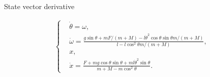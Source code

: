 \documentclass{article}
\begin{document}
State vector derivative

\begin{eqnarray}
\left\{
\begin{aligned}
& \dot{\theta}=\omega,\\
& \dot{\omega}=\frac{g\sin\theta+mF/(m+M)-l\dot{\theta}^2\cos\theta\sin\theta m/(m+M)}{l-l\cos^2\theta m/(m+M)},\\
& x,\\
& \dot{x}=\frac{F+mg\cos\theta\sin\theta+ml\dot{\theta}^2\sin\theta}{m+M-m\cos^2\theta}.
\end{aligned}
\right.
\end{eqnarray}
	
\end{document}
